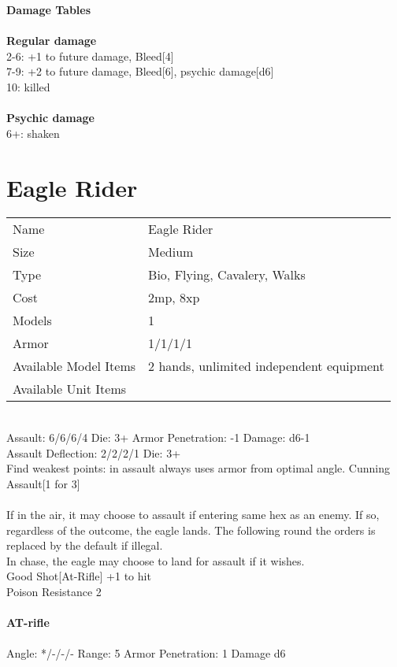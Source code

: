 {\bf Damage Tables} \\
\ \\ {\bf Regular damage } \\
2-6: +1 to future damage, Bleed[4] \\
7-9: +2 to future damage, Bleed[6], psychic damage[d6] \\
10: killed \\
\ \\ {\bf Psychic damage } \\
6+: shaken \\









\pagebreak

\section{ Eagle Rider }

\begin{tabular}{ll}
  Name & Eagle Rider \\
  Size & Medium\\
  Type & Bio, Flying, Cavalery, Walks\\
  Cost & 2mp, 8xp\\
  Models & 1\\
  Armor & 1/1/1/1\\
  Available Model Items & 2 hands, unlimited independent equipment \\
  Available Unit Items &  \\
\end{tabular}

\ \\
Assault: 6/6/6/4 Die: 3+ Armor Penetration: -1 Damage: d6-1 \\
Assault Deflection: 2/2/2/1 Die: 3+\\
\indent Find weakest points: in assault always uses armor from optimal angle. Cunning Assault[1 for 3] \\
\ \\
If in the air, it may choose to assault if entering same hex as an enemy. If so, regardless of the outcome, the eagle lands. The following round the orders is replaced by the default if illegal. \\ In chase, the eagle may choose to land for assault if it wishes. \\ Good Shot[At-Rifle] +1 to hit\\ Poison Resistance 2
\ \\
\ \\
{\bf AT-rifle } \\
\ \\
Angle: */-/-/- Range: 5 Armor Penetration: 1 Damage d6 \\
\indent  \\



